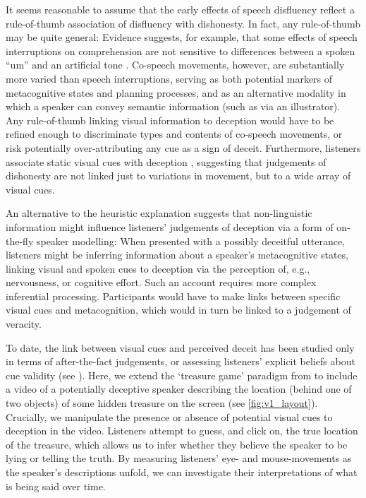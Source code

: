 \documentclass[a4paper,man,natbib]{apa6}
\newcommand*{\spex}[1]{``{#1}''} %
\begin{document}
It seems reasonable to assume that the early effects of speech disfluency reflect a rule-of-thumb association of disfluency with dishonesty.
In fact, any rule-of-thumb may be quite general:  Evidence suggests, for example, that some effects of speech interruptions on comprehension are not sensitive to differences between a spoken \spex{um} and an artificial tone \citep{Corley2011}.
Co-speech movements, however, are substantially more varied than speech interruptions, serving as both potential markers of metacognitive states and planning processes, and as an alternative modality in which a speaker can convey semantic information (such as via an illustrator).
Any rule-of-thumb linking visual information to deception would have to be refined enough to discriminate types and contents of co-speech movements, or risk potentially over-attributing any cue as a sign of deceit.
Furthermore, listeners associate static visual cues with deception \citep[e.g. eye-gaze,][]{Zuckerman1981a}, suggesting that judgements of dishonesty are not linked just to variations in movement, but to a wide array of visual cues. 

An alternative to the heuristic explanation suggests that non-linguistic information might influence listeners' judgements of deception via a form of on-the-fly speaker modelling: 
When presented with a possibly deceitful utterance, listeners might be inferring information about a speaker's metacognitive states, linking visual and spoken cues to deception via the perception of, e.g., nervousness, or cognitive effort. 
Such an account requires more complex inferential processing.
Participants would have to make links between specific visual cues and metacognition, which would in turn be linked to a judgement of veracity.

To date, the link between visual cues and perceived deceit has been studied only in terms of after-the-fact judgements, or assessing listeners' explicit beliefs about cue validity (see \citealt{Vrij1996a, Zuckerman1981a}).
Here, we extend the `treasure game' paradigm from \citet{Loy2017} to include a video of a potentially deceptive speaker describing the location (behind one of two objects) of some hidden treasure on the screen (see \ref{fig:v1_layout}).
Crucially, we manipulate the presence or absence of potential visual cues to deception in the video.
Listeners attempt to guess, and click on, the true location of the treasure, which allows us to infer whether they believe the speaker to be lying or telling the truth.
By measuring listeners' eye- and mouse-movements as the speaker's descriptions unfold, we can investigate their interpretations of what is being said over time.
\end{document}

